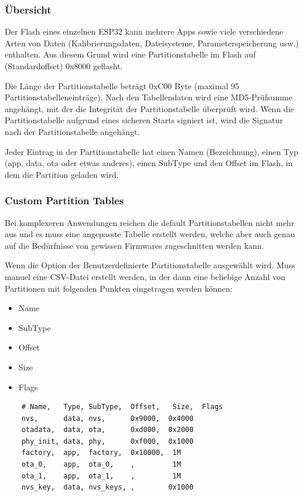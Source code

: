 \subsubsection{Übersicht}
Der Flash eines einzelnen ESP32 kann mehrere Apps sowie viele verschiedene Arten von Daten (Kalibrierungsdaten, Dateisysteme, Parameterspeicherung usw.) enthalten. Aus diesem Grund wird eine Partitionstabelle im Flash auf (Standardoffset) 0x8000 geflasht.

Die Länge der Partitionstabelle beträgt 0xC00 Byte (maximal 95 Partitionstabelleneinträge). Nach den Tabellendaten wird eine MD5-Prüfsumme angehängt, mit der die Integrität der Partitionstabelle überprüft wird. Wenn die Partitionstabelle aufgrund eines sicheren Starts signiert ist, wird die Signatur nach der Partitionstabelle angehängt.

Jeder Eintrag in der Partitionstabelle hat einen Namen (Bezeichnung), einen Typ (app, data, ota oder etwas anderes), einen SubType und den Offset im Flash, in dem die Partition geladen wird.

\subsubsection{Custom Partition Tables}
Bei komplexeren Anwendungen reichen die default Partitionstabellen nicht mehr aus und es muss eine angepasste Tabelle erstellt werden, welche aber auch genau auf die Bedürfnisse von gewissen Firmwares zugeschnitten werden kann.

Wenn die Option der Benutzerdefinierte Partitionstabelle ausgewählt wird. Muss manuel eine CSV-Datei erstellt werden, in der dann eine beliebige Anzahl von Partitionen mit folgenden Punkten eingetragen werden können:

\begin{itemize}
    \item Name
    \item SubType
    \item Offset
    \item Size
    \item Flags
\end{itemize}

\begin{verbatim}
    # Name,   Type, SubType,  Offset,   Size,  Flags
    nvs,      data, nvs,      0x9000,  0x4000
    otadata,  data, ota,      0xd000,  0x2000
    phy_init, data, phy,      0xf000,  0x1000
    factory,  app,  factory,  0x10000,  1M
    ota_0,    app,  ota_0,    ,         1M
    ota_1,    app,  ota_1,    ,         1M
    nvs_key,  data, nvs_keys, ,        0x1000
\end{verbatim}

